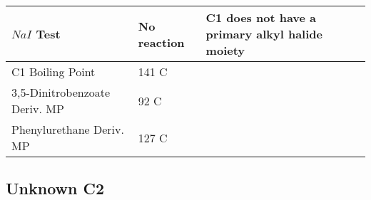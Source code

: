 \documentclass{article}
\begin{document}
\begin{table}[h]
\begin{tabular}{ l  p{3.0cm} p{5.4cm} }
			$NaI$ Test & No reaction & C1 does not have a primary alkyl halide moiety \\\hline 
			
			C1 Boiling Point & 141 C &  \\\hline
			
			3,5-Dinitrobenzoate Deriv. MP & 92 C &  \\\hline 
			
			Phenylurethane Deriv. MP & 127 C &  \\\hline 
			
			
			
		\end{tabular}
	\end{table}
	\pagebreak
	
	\subsection{Unknown C2}
\end{document}
